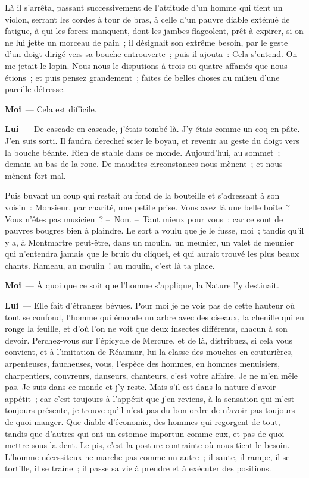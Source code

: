 \documentclass[french,twoside]{book} %
\newcommand{\labelchar}[1]{\textbf{\color{rubric} #1}}
\begin{document}
Là il s’arrêta, passant successivement de l’attitude d’un homme qui tient un violon, serrant les cordes à tour de bras, à celle d’un pauvre diable exténué de fatigue, à qui les forces manquent, dont les jambes flageolent, prêt à expirer, si on ne lui jette un morceau de pain ; il désignait son extrême besoin, par le geste d’un doigt dirigé vers sa bouche entrouverte ; puis il ajouta : Cela s’entend. On me jetait le lopin. Nous nous le disputions à trois ou quatre affamés que nous étions ; et puis pensez grandement ; faites de belles choses au milieu d’une pareille détresse.\par
\labelchar{Moi} — Cela est difficile.\par
\labelchar{Lui} — De cascade en cascade, j’étais tombé là. J’y étais comme un coq en pâte. J’en suis sorti. Il faudra derechef scier le boyau, et revenir au geste du doigt vers la bouche béante. Rien de stable dans ce monde. Aujourd’hui, au sommet ; demain au bas de la roue. De maudites circonstances nous mènent ; et nous mènent fort mal.\par
Puis buvant un coup qui restait au fond de la bouteille et s’adressant à son voisin : Monsieur, par charité, une petite prise. Vous avez là une belle boîte ? Vous n’êtes pas musicien ? – Non. – Tant mieux pour vous ; car ce sont de pauvres bougres bien à plaindre. Le sort a voulu que je le fusse, moi ; tandis qu’il y a, à Montmartre peut-être, dans un moulin, un meunier, un valet de meunier qui n’entendra jamais que le bruit du cliquet, et qui aurait trouvé les plus beaux chants. Rameau, au moulin ! au moulin, c’est là ta place.\par
\labelchar{Moi} — À quoi que ce soit que l’homme s’applique, la Nature l’y destinait.\par
\labelchar{Lui} — Elle fait d’étranges bévues. Pour moi je ne vois pas de cette hauteur où tout se confond, l’homme qui émonde un arbre avec des ciseaux, la chenille qui en ronge la feuille, et d’où l’on ne voit que deux insectes différents, chacun à son devoir. Perchez-vous sur l’épicycle de Mercure, et de là, distribuez, si cela vous convient, et à l’imitation de Réaumur, lui la classe des mouches en couturières, arpenteuses, faucheuses, vous, l’espèce des hommes, en hommes menuisiers, charpentiers, couvreurs, danseurs, chanteurs, c’est votre affaire. Je ne m’en mêle pas. Je suis dans ce monde et j’y reste. Mais s’il est dans la nature d’avoir appétit ; car c’est toujours à l’appétit que j’en reviens, à la sensation qui m’est toujours présente, je trouve qu’il n’est pas du bon ordre de n’avoir pas toujours de quoi manger. Que diable d’économie, des hommes qui regorgent de tout, tandis que d’autres qui ont un estomac importun comme eux, et pas de quoi mettre sous la dent. Le pis, c’est la posture contrainte où nous tient le besoin. L’homme nécessiteux ne marche pas comme un autre ; il saute, il rampe, il se tortille, il se traîne ; il passe sa vie à prendre et à exécuter des positions.\par
\end{document}
